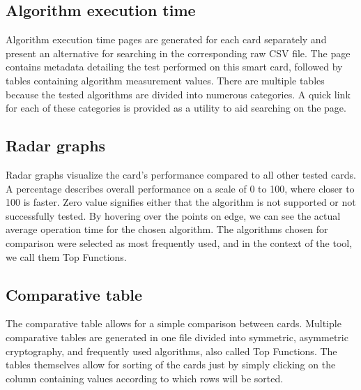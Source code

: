 
\subsection{Algorithm execution time}
Algorithm execution time pages are generated for each card separately and present an alternative for searching in the corresponding raw CSV file. The page contains metadata detailing the test performed on this smart card, followed by tables containing algorithm measurement values. There are multiple tables because the tested algorithms are divided into numerous categories. A quick link for each of these categories is provided as a utility to aid searching on the page.


\subsection{Radar graphs}
Radar graphs visualize the card's performance compared to all other tested cards. A percentage describes overall performance on a scale of 0 to 100, where closer to 100 is faster. Zero value signifies either that the algorithm is not supported or not successfully tested. By hovering over the points on edge, we can see the actual average operation time for the chosen algorithm. The algorithms chosen for comparison were selected as most frequently used, and in the context of the tool, we call them Top Functions. 


\subsection{Comparative table}
The comparative table allows for a simple comparison between cards. Multiple comparative tables are generated in one file divided into symmetric, asymmetric cryptography, and frequently used algorithms, also called Top Functions. The tables themselves allow for sorting of the cards just by simply clicking on the column containing values according to which rows will be sorted.

